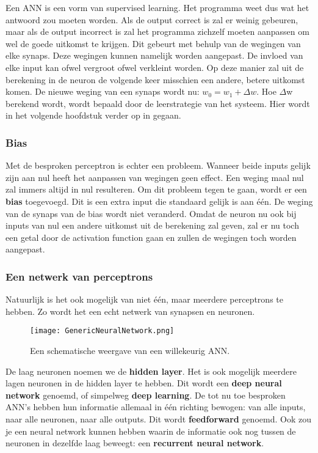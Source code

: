 Een ANN is een vorm van supervised learning. Het programma weet dus wat het antwoord zou moeten worden. Als de output correct is zal er weinig gebeuren, maar als de output incorrect is zal het programma zichzelf moeten aanpassen om wel de goede uitkomst te krijgen. Dit gebeurt met behulp van de wegingen van elke synaps. Deze wegingen kunnen namelijk worden aangepast. De invloed van elke input kan ofwel vergroot ofwel verkleint worden. Op deze manier zal uit de berekening in de neuron de volgende keer misschien een andere, betere uitkomst komen. De nieuwe weging van een synaps wordt nu: $ w_{0} = w_{1} + \Delta w $.
Hoe $ \Delta $w berekend wordt, wordt bepaald door de leerstrategie van het systeem. Hier wordt in het volgende hoofdstuk verder op in gegaan.

\subsubsection{Bias}
Met de besproken perceptron is echter een probleem. Wanneer beide inputs gelijk zijn aan nul heeft het aanpassen van wegingen geen effect. Een weging maal nul zal immers altijd in nul resulteren. Om dit probleem tegen te gaan, wordt er een \textbf{bias} toegevoegd. Dit is een extra input die standaard gelijk is aan \'{e}\'{e}n. De weging van de synaps van de bias wordt niet veranderd. Omdat de neuron nu ook bij inputs van nul een andere uitkomst uit de berekening zal geven, zal er nu toch een getal door de activation function gaan en zullen de wegingen toch worden aangepast. 

\subsubsection{Een netwerk van perceptrons}
Natuurlijk is het ook mogelijk van niet \'{e}\'{e}n, maar meerdere perceptrons te hebben. Zo wordt het een echt netwerk van synapsen en neuronen.

\begin{figure}[h]
  \centering
    \texttt{[image: GenericNeuralNetwork.png]}
  \caption{Een schematische weergave van een willekeurig ANN.}
  \label{fig:ANN}
\end{figure}

De laag neuronen noemen we de \textbf{hidden layer}. Het is ook mogelijk meerdere lagen neuronen in de hidden layer te hebben. Dit wordt een \textbf{deep neural network} genoemd, of simpelweg \textbf{deep learning}.
De tot nu toe besproken ANN’s hebben hun informatie allemaal in \'{e}\'{e}n richting bewogen: van alle inputs, naar alle neuronen, naar alle outputs. Dit wordt \textbf{feedforward} genoemd. Ook zou je een neural network kunnen hebben waarin de informatie ook nog tussen de neuronen in dezelfde laag beweegt: een \textbf{recurrent neural network}.

